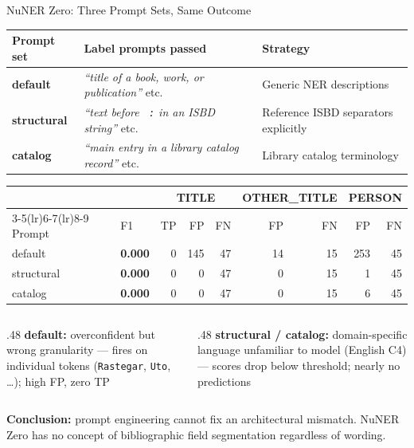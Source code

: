 \documentclass[xcolor,aspectratio=169,compress]{beamer}
\begin{document}
\begin{frame}[shrink=1]{NuNER Zero: Three Prompt Sets, Same Outcome}
  \small
  \begin{tabular}{llp{5cm}}
    \toprule
    Prompt set & Label prompts passed & Strategy \\
    \midrule
    \textbf{default}    & \textit{``title of a book, work, or publication''} etc.\ & Generic NER descriptions \\
    \textbf{structural} & \textit{``text before \texttt{ :} in an ISBD string''} etc.\ & Reference ISBD separators explicitly \\
    \textbf{catalog}    & \textit{``main entry in a library catalog record''} etc.\ & Library catalog terminology \\
    \bottomrule
  \end{tabular}

  \begin{tabular}{llrrrrrrr}
    \toprule
    & & \multicolumn{3}{c}{TITLE} & \multicolumn{2}{c}{OTHER\_TITLE} & \multicolumn{2}{c}{PERSON} \\
    \cmidrule(lr){3-5}\cmidrule(lr){6-7}\cmidrule(lr){8-9}
    Prompt & F1 & TP & FP & FN & FP & FN & FP & FN \\
    \midrule
    default    & \textbf{0.000} &  0 & 145 & 47 & 14 & 15 & 253 & 45 \\
    structural & \textbf{0.000} &  0 &   0 & 47 &  0 & 15 &   1 & 45 \\
    catalog    & \textbf{0.000} &  0 &   0 & 47 &  0 & 15 &   6 & 45 \\
    \bottomrule
  \end{tabular}

  \footnotesize
  \begin{columns}[t]
    \begin{column}{.48\textwidth}
      \textbf{default:} overconfident but wrong granularity ---
      fires on individual tokens (\texttt{Rastegar}, \texttt{Uto}, \ldots); high FP, zero TP
    \end{column}
    \begin{column}{.48\textwidth}
      \textbf{structural / catalog:} domain-specific language unfamiliar to model (English C4) ---
      scores drop below threshold; nearly no predictions
    \end{column}
  \end{columns}
  \small\textbf{Conclusion:} prompt engineering cannot fix an architectural mismatch.
  NuNER Zero has no concept of bibliographic field segmentation regardless of wording.
\end{frame}
\end{document}
